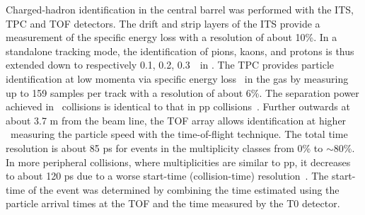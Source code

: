 Charged-hadron identification in the central barrel was performed with the ITS, TPC and TOF detectors. The drift and strip layers of the ITS provide a measurement of the specific energy loss with a resolution of about 10\%. In a standalone tracking mode, the identification of pions, kaons, and protons is thus extended down to respectively 0.1, 0.2, 0.3~\gevc\ in \pt. The TPC provides particle identification at low momenta via specific energy loss \dedx\ in the gas by measuring up to 159 samples per track with a resolution of about 6\%. The separation power achieved in \pPb\ collisions is identical to that in pp collisions~\cite{Abelev:2014ffa}. Further outwards at about 3.7 m from the beam line, the TOF array allows identification at higher \pt\ measuring the particle speed with the time-of-flight technique. The total time resolution is about 85 ps for events in the multiplicity classes from 0\% to $\sim 80$\%.  In more peripheral collisions, where multiplicities are similar to pp, it decreases to about 120 ps due to a worse start-time (collision-time) resolution~\cite{Abelev:2014ffa}. The start-time of the event was determined by combining the time estimated using the particle arrival times at the TOF and the time measured by the T0 detector.


